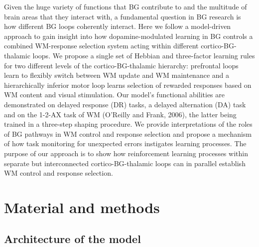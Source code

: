 \documentclass[
  11pt,
  a4paper,
]{scrbook}
\begin{document}
Given the huge variety of functions that BG contribute to and the
multitude of brain areas that they interact with, a fundamental question
in BG research is how different BG loops coherently interact. Here we
follow a model-driven approach to gain insight into how
dopamine-modulated learning in BG controls a combined WM-response
selection system acting within different cortico-BG-thalamic loops. We
propose a single set of Hebbian and three-factor learning rules for two
different levels of the cortico-BG-thalamic hierarchy: prefrontal loops
learn to flexibly switch between WM update and WM maintenance and a
hierarchically inferior motor loop learns selection of rewarded
responses based on WM content and visual stimulation. Our model's
functional abilities are demonstrated on delayed response (DR) tasks, a
delayed alternation (DA) task and on the 1-2-AX task of WM (O'Reilly and
Frank, 2006), the latter being trained in a three-step shaping
procedure. We provide interpretations of the roles of BG pathways in WM
control and response selection and propose a mechanism of how task
monitoring for unexpected errors instigates learning processes. The
purpose of our approach is to show how reinforcement learning processes
within separate but interconnected cortico-BG-thalamic loops can in
parallel establish WM control and response selection.

\section{Material and methods}\label{material-and-methods-1}

\subsection{Architecture of the model}\label{sec-nn:architecture}
\end{document}
